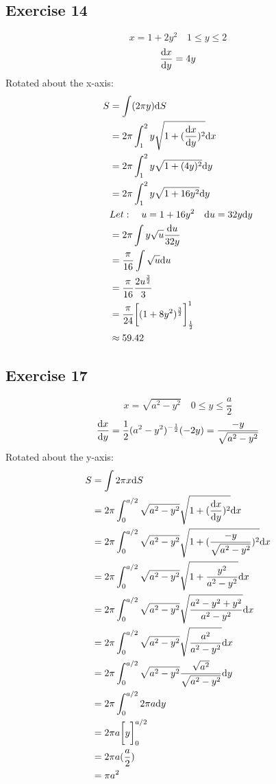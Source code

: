 \documentclass{math}
\begin{document}
\subsection*{Exercise 14}
\[ x = 1+2y^{2} \quad 1 \leq y \leq 2 \]
\[ \frac{\mathrm{d}{x}}{\mathrm{d}{y}} = 4y \]
Rotated about the x-axis:
\begin{align*}
  S &= \int(2\pi y)\mathrm{d}{S} \\
  &= 2\pi\int_{1}^{2}{ y\sqrt{1+(\frac{\mathrm{d}{x}}{\mathrm{d}{y}})^{2}}\mathrm{d}{x}} \\
  &= 2\pi\int_{1}^{2}{y\sqrt{1+(4y)^{2}}\mathrm{d}{y}} \\
  &= 2\pi\int_{1}^{2}{y\sqrt{1+16y^{2}}\mathrm{d}{y}} \\
  & Let: \quad u = 1+16y^{2} \quad \mathrm{d}{u} = 32y\mathrm{d}{y} \\
  &= 2\pi\int{y\sqrt{u}\frac{\mathrm{d}{u}}{32y}} \\
  &= \frac{\pi}{16}\int{\sqrt{u}\mathrm{d}{u}} \\
  &= \frac{\pi}{16}\frac{2u^{\frac{3}{2}}}{3} \\
  &= \frac{\pi}{24}\bigg[(1+8y^{2})^{\frac{3}{2}}\bigg]_{\frac{1}{2}}^{1} \\
  & \approx 59.42
\end{align*}

\subsection*{Exercise 17}
\[ x = \sqrt{a^{2}-y^{2}} \quad 0 \leq y \leq \frac{a}{2} \]
\[ \frac{\mathrm{d}{x}}{\mathrm{d}{y}} = \frac{1}{2}(a^{2}-y^{2})^{-\frac{1}{2}}(-2y)
   = \frac{-y}{\sqrt{a^{2}-y^{2}}} \]
Rotated about the y-axis:
\begin{align*}
  S &= \int{2\pi x\mathrm{d}{S}} \\
  &= 2\pi\int_{0}^{a/2}{
    \sqrt{a^{2}-y^{2}}\sqrt{1+(\frac{\mathrm{d}{x}}{\mathrm{d}{y}})^{2}}\mathrm{d}{x}} \\
  &= 2\pi\int_{0}^{a/2}{
    \sqrt{a^{2}-y^{2}}\sqrt{1+(\frac{-y}{\sqrt{a^{2}-y^{2}}})^{2}}\mathrm{d}{x}} \\
  &= 2\pi\int_{0}^{a/2}{
    \sqrt{a^{2}-y^{2}}\sqrt{1+\frac{y^{2}}{a^{2}-y^{2}}}\mathrm{d}{x}} \\
  &= 2\pi\int_{0}^{a/2}{
    \sqrt{a^{2}-y^{2}}\sqrt{\frac{a^{2}-y^{2}+y^{2}}{a^{2}-y^{2}}}\mathrm{d}{x}} \\
  &= 2\pi\int_{0}^{a/2}{
    \sqrt{a^{2}-y^{2}}\sqrt{\frac{a^{2}}{a^{2}-y^{2}}}\mathrm{d}{x}} \\
  &= 2\pi\int_{0}^{a/2}{
    \sqrt{a^{2}-y^{2}}\frac{\sqrt{a^{2}}}{\sqrt{a^{2}-y^{2}}}\mathrm{d}{y}} \\
  &= 2\pi\int_{0}^{a/2}{2\pi a\mathrm{d}{y}} \\
  &= 2\pi a\bigg[y\bigg]_{0}^{a/2} \\
  &= 2\pi a(\frac{a}{2}) \\
  &= \pi a^{2}
\end{align*}
\end{document}

